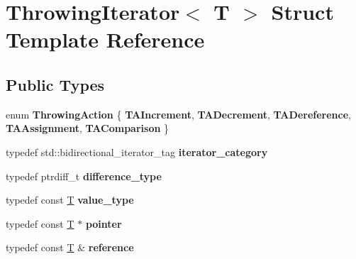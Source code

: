 \hypertarget{struct_throwing_iterator}{}\section{Throwing\+Iterator$<$ T $>$ Struct Template Reference}
\label{struct_throwing_iterator}
\subsection*{Public Types}
\begin{DoxyCompactItemize}
\item 
\mbox{\label{struct_throwing_iterator_ad8ca04f378d841bcfadf5cfb73d3b6dc}} 
enum {\bfseries Throwing\+Action} \{ \newline
{\bfseries T\+A\+Increment}, 
{\bfseries T\+A\+Decrement}, 
{\bfseries T\+A\+Dereference}, 
{\bfseries T\+A\+Assignment}, 
\newline
{\bfseries T\+A\+Comparison}
 \}
\item 
\mbox{\label{struct_throwing_iterator_a58c38e65299563a6bbaf03a6b4b20a88}} 
typedef std\+::bidirectional\+\_\+iterator\+\_\+tag {\bfseries iterator\+\_\+category}
\item 
\mbox{\label{struct_throwing_iterator_a109769b1be730451cfab62ab0c3c9ce8}} 
typedef ptrdiff\+\_\+t {\bfseries difference\+\_\+type}
\item 
\mbox{\label{struct_throwing_iterator_a405edc636f33237155fc61a265c693db}} 
typedef const \mbox{\hyperlink{struct_t}{T}} {\bfseries value\+\_\+type}
\item 
\mbox{\label{struct_throwing_iterator_a7ae431eb2ef765b18c4abb8e6548b37d}} 
typedef const \mbox{\hyperlink{struct_t}{T}} $\ast$ {\bfseries pointer}
\item 
\mbox{\label{struct_throwing_iterator_a0b1d71fb6a36dfb5de3d46a0488e8585}} 
typedef const \mbox{\hyperlink{struct_t}{T}} \& {\bfseries reference}
\end{DoxyCompactItemize}
